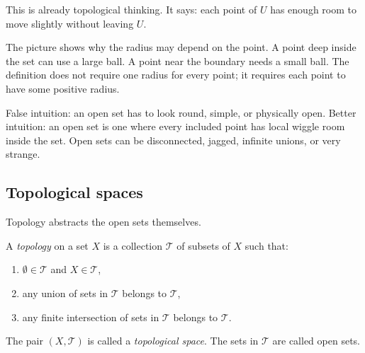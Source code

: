 This is already topological thinking. It says: each point of $U$ has enough
room to move slightly without leaving $U$.

\begin{center}
\end{center}

The picture shows why the radius may depend on the point. A point deep inside
the set can use a large ball. A point near the boundary needs a small ball.
The definition does not require one radius for every point; it requires each
point to have some positive radius.

\begin{trapbox}
False intuition: an open set has to look round, simple, or physically open.
Better intuition: an open set is one where every included point has local wiggle
room inside the set. Open sets can be disconnected, jagged, infinite unions, or
very strange.
\end{trapbox}

\subsection{Topological spaces}

Topology abstracts the open sets themselves.

\begin{definition}
A \emph{topology} on a set $X$ is a collection $\mathcal{T}$ of subsets of $X$
such that:
\begin{enumerate}
\item $\emptyset\in\mathcal{T}$ and $X\in\mathcal{T}$,
\item any union of sets in $\mathcal{T}$ belongs to $\mathcal{T}$,
\item any finite intersection of sets in $\mathcal{T}$ belongs to $\mathcal{T}$.
\end{enumerate}
The pair $(X,\mathcal{T})$ is called a \emph{topological space}. The sets in
$\mathcal{T}$ are called open sets.
\end{definition}

